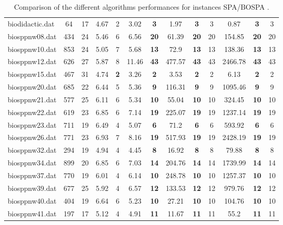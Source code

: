 \begin{table}[h]
{\begin{tabular}{lcccccccccccc}
biodidactic.dat & 64 & 17 & 4.67 & 2 & 3.02 &  \textbf{3} & 1.97 &  \textbf{3} & 3 &  \textcolor{blue2}{0.87} &  \textbf{3} & 3 \\
biosppnw08.dat & 434 & 24 &  \textcolor{blue2}{5.46} & 6 & 6.56 &  \textbf{20} & 61.39 &  \textbf{20} & 20 & 154.85 &  \textbf{20} & 20 \\
biosppnw10.dat & 853 & 24 &  \textcolor{blue2}{5.05} & 7 & 5.68 &  \textbf{13} & 72.9 &  \textbf{13} & 13 & 138.36 &  \textbf{13} & 13 \\
biosppnw12.dat & 626 & 27 &  \textcolor{blue2}{5.87} & 8 & 11.46 &  \textbf{43} & 477.57 &  \textbf{43} & 43 & 2466.78 &  \textbf{43} & 43 \\
biosppnw15.dat & 467 & 31 & 4.74 &  \textbf{2} &  \textcolor{blue2}{3.26} &  \textbf{2} & 3.53 &  \textbf{2} & 2 & 6.13 &  \textbf{2} & 2 \\
biosppnw20.dat & 685 & 22 & 6.44 & 5 &  \textcolor{blue2}{5.36} &  \textbf{9} & 116.31 &  \textbf{9} & 9 & 1095.46 &  \textbf{9} & 9 \\
biosppnw21.dat & 577 & 25 & 6.11 & 6 &  \textcolor{blue2}{5.34} &  \textbf{10} & 55.04 &  \textbf{10} & 10 & 324.45 &  \textbf{10} & 10 \\
biosppnw22.dat & 619 & 23 &  \textcolor{blue2}{6.85} & 6 & 7.14 &  \textbf{19} & 225.07 &  \textbf{19} & 19 & 1237.14 &  \textbf{19} & 19 \\
biosppnw23.dat & 711 & 19 & 6.49 & 4 &  \textcolor{blue2}{5.07} &  \textbf{6} & 71.2 &  \textbf{6} & 6 & 593.92 &  \textbf{6} & 6 \\
biosppnw26.dat & 771 & 23 &  \textcolor{blue2}{6.93} & 7 & 8.16 &  \textbf{19} & 517.93 &  \textbf{19} & 19 & 2428.19 &  \textbf{19} & 19 \\
biosppnw32.dat & 294 & 19 & 4.94 & 4 &  \textcolor{blue2}{4.45} &  \textbf{8} & 16.92 &  \textbf{8} & 8 & 79.88 &  \textbf{8} & 8 \\
biosppnw34.dat & 899 & 20 &  \textcolor{blue2}{6.85} & 6 & 7.03 &  \textbf{14} & 204.76 &  \textbf{14} & 14 & 1739.99 &  \textbf{14} & 14 \\
biosppnw37.dat & 770 & 19 &  \textcolor{blue2}{6.01} & 4 & 6.14 &  \textbf{10} & 248.78 &  \textbf{10} & 10 & 1257.37 &  \textbf{10} & 10 \\
biosppnw39.dat & 677 & 25 &  \textcolor{blue2}{5.92} & 4 & 6.57 &  \textbf{12} & 133.53 &  \textbf{12} & 12 & 979.76 &  \textbf{12} & 12 \\
biosppnw40.dat & 404 & 19 & 6.64 & 6 &  \textcolor{blue2}{5.23} &  \textbf{10} & 27.21 &  \textbf{10} & 10 & 104.76 &  \textbf{10} & 10 \\
biosppnw41.dat & 197 & 17 & 5.12 & 4 &  \textcolor{blue2}{4.91} &  \textbf{11} & 11.67 &  \textbf{11} & 11 & 55.2 &  \textbf{11} & 11 \\
\bottomrule
\end{tabular}
}%
\caption{Comparison of the different algorithms performances for instances SPA/BOSPA .}
\label{tab:table_compare_SPA/BOSPA }
\end{table}
